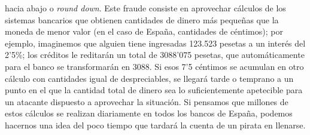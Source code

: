 hacia abajo o {\it round down}. Este fraude consiste en aprovechar c\'alculos
de los sistemas bancarios que obtienen cantidades de dinero m\'as peque\~nas que
la moneda de menor valor (en el caso de Espa\~na, cantidades de c\'entimos);
por ejemplo, imaginemos que alguien tiene ingresadas 123.523 pesetas a un
inter\'es del 2'5\%; los cr\'editos le reditar\'an un total de 3088'075 pesetas,
que autom\'aticamente para el banco se transformar\'an en 3088. Si esos 7'5
c\'entimos se acumulan en otro c\'alculo con cantidades igual de despreciables,
se llegar\'a tarde o temprano a un punto en el que la cantidad total de dinero
sea lo suficientemente apetecible para un atacante dispuesto a aprovechar la
situaci\'on. Si pensamos que millones de estos c\'alculos se realizan 
diariamente en todos los bancos de Espa\~na, podemos hacernos una idea del poco 
tiempo que tardar\'a la cuenta de un pirata en llenarse.
